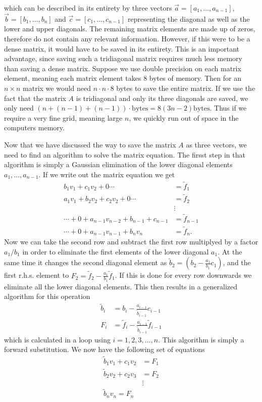 \documentclass[twocolumn]{aastex62}
\begin{document}
which can be described in its entirety by three vectors $\vec{a} = [a_1,\ldots, a_{n-1}]$, $\vec{b} = [b_1,\ldots,b_n]$ and $\vec{c} = [c_1,\ldots,c_{n-1}]$ representing the diagonal as well as the lower and upper diagonals. The remaining matrix elements are made up of zeros, therefore do not contain any relevant information. However, if this were to be a dense matrix, it would have to be saved in its entirety. This is an important advantage, since saving such a tridiagonal matrix requires much less memory than saving a dense matrix. Suppose we use double precision on each matrix element, meaning each matrix element takes 8 bytes of memory. Then for an $n\times n$ matrix we would need $n\cdot n\cdot 8$ bytes to save the entire matrix. If we use the fact that the matrix $A$ is tridiagonal and only its three diagonals are saved, we only need $\left(n + (n-1) + (n-1)\right) \cdot \text{bytes} = 8(3n - 2) \text{bytes}$. Thus if we require a very fine grid, meaning large $n$, we quickly run out of space in the computers memory. 

Now that we have discussed the way to save the matrix $A$ as three vectors, we need to find an algorithm to solve the matrix equation. The firsst step in that algorithm is simply a Gaussian elimination of the lower diagonal elements $a_1,\ldots, a_{n-1}$. If we write out the matrix equation we get 
\begin{align}
	b_1 v_1 + c_1v_2 + 0  \cdots &= \tilde{f}_1\\
	a_1 v_1 + b_2 v_2 + c_2 v_2 + 0 \cdots &= \tilde{f}_2\\
	&\vdots\\
	\cdots+0+a_{n-1} v_{n-2} + b_{n-1} + c_{n-1} &= \tilde{f}_{n-1}\\
	\cdots+0+a_{n-1}v_{n-1} + b_{n} v_{n} &= \tilde{f}_n.
\end{align}
Now we can take the second row and subtract the first row multiplyed by a factor $a_1/b_1$ in order to eliminate the first elements of the lower diagonal $a_1$. At the same time it changes the second diagonal element as $\tilde{b}_2 = (b_2 - \frac{a_1}{b_1}c_1)$, and the first r.h.s. element to $F_2 = \tilde{f}_2 - \frac{a_1}{b_1}\tilde{f}_1$. If this is done for every row downwards we eliminate all the lower diagonal elements. This then results in a generalized algorithm for this operation
\begin{align}
	\tilde{b}_i &= b_i - \frac{a_{i-1}}{\tilde{b}_{i-1}}c_{i-1}
	\label{eq:first_forward}\\
	F_i & = \tilde{f}_i - \frac{a_{i-1}}{\tilde{b}_{i-1}}\tilde{f}_{i - 1}\label{eq:second_forward}
\end{align}
which is calculated in a loop using $i=1,2,3,\ldots, n$. This algorithm is simply a forward substitution. We now have the following set of equations
\begin{align}
	\tilde{b}_1v_1 + c_1v_2  &= F_1\\
	\tilde{b}_2v_2 + c_2v_3 &= F_2\\
	&\vdots\\
	\tilde{b}_nv_n = F_n
	\label{eq:backward}	
\end{align}
\end{document}
